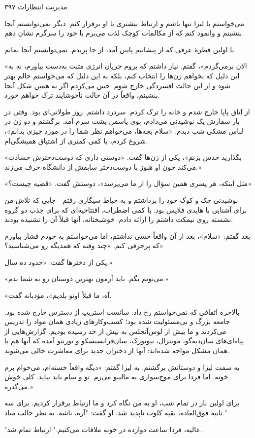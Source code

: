 مدیریت انتظارات ۳۹۷

می‌خواستم با لیزا تنها باشم و ارتباط بیشتری با او برقرار کنم. دیگر نمی‌توانستم آنجا بنشینم و وانمود کنم که از مکالمات کوچک لذت می‌برم یا خود را سرگرم نشان دهم.

با اولین قطرهٔ عرقی که از پیشانیم پایین آمد، از جا پریدم. نمی‌توانستم آنجا بمانم.

«الان برمی‌گردم»، گفتم. نیاز داشتم که بروم جریان انرژی مثبت به‌دست بیاورم، نه به این دلیل که بخواهم زن‌ها را انتخاب کنم، بلکه به این دلیل که می‌خواستم حالم بهتر شود و از این حالت افسردگی خارج شوم. حس می‌کردم اگر به همین شکل آنجا بنشینم، واقعاً در آن حالت ناخوشایند ترک خواهم خورد.

از اتاق پاپا خارج شدم و خانه را ترک کردم. سردرد داشتم. روز طولانی‌ای بود. وقتی در بار سفارش یک نوشیدنی می‌دادم، بوی یاسمن پشت سرم آمد. برگشتم و دو زن در لباس‌ مشکی شب دیدم. «سلام بچه‌ها، می‌خواهم نظر شما را در مورد چیزی بدانم»، شروع کردم، با کمی کمتری از اشتیاق همیشگی‌ام.

«بگذارید حدس بزنم»، یکی از زن‌ها گفت. «دوستی داری که دوست‌دخترش حسادت می‌کند چون او هنوز با دوست‌دختر سابقش از دانشگاه حرف می‌زند.»

«مثل اینکه، هر پسری همین سؤال را از ما می‌پرسد»، دوستش گفت. «قضیه چیست؟»

نوشیدنی جک و کوک خود را برداشتم و به حیاط سیگاری رفتم—جایی که تلاش من برای آشنایی با هایدی فلایس بود. با کمی اضطراب، افتتاحیه‌ای که برای جذب دو گروه نشسته روی نیمکت داشتم را ارائه دادم. خوشبختانه، آنها قبلاً آن را نشنیده بودند.

بعد گفتم: «سلام»، بعد از آن واقعاً حسی نداشتم، اما می‌خواستم به خودم فشار بیاورم که پرحرفی کنم. «چند وقته که همدیگه رو می‌شناسید؟»

یکی از دخترها گفت: «حدود ده سال.»

«می‌تونم بگم. باید آزمون بهترین دوستان رو به شما بدم.»

«آه، ما قبلاً اونو بلدیم»، مؤدبانه گفت.

بالاخره اتفاقی که نمی‌خواستم رخ داد: سانست استریپ از دسترس خارج شده بود. جامعه بزرگ و بی‌مسئولیت شده بود؛ کسب‌وکارهای زیادی همان مواد را تدریس می‌کردند و ما بیش از لوس‌آنجلس به بیش از حد رسیده بودیم. گزارش‌هایی از پیاه‌ای‌های سان‌دیه‌گو، مونترال، نیویورک، سان‌فرانسیسکو و تورنتو آمده که آنها هم با همان مشکل مواجه شده‌اند: آنها از دختران جدید برای معاشرت خالی می‌شوند.

به سمت لیزا و دوستانش برگشتم. به لیزا گفتم: «دیگه واقعاً خسته‌ام، می‌خوام برم خونه. اما فردا برای موج‌سواری به مالیبو می‌رم. تو و سام باید بیاید. کلی خوش می‌گذره.»

برای اولین بار در تمام شب، او به من نگاه کرد و ما ارتباط برقرار کردیم. برای سه ثانیه فوق‌العاده، بقیه کلوب ناپدید شد. او گفت: "آره، باشه. به نظر جالب میاد."

"عالیه، فردا ساعت دوازده در خونه ملاقات می‌کنیم." ارتباط تمام شد.